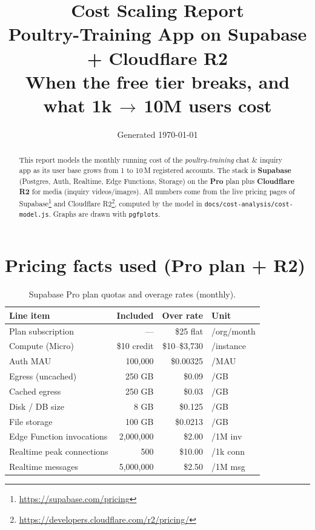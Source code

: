 \documentclass[11pt]{article}
\title{\textbf{Cost Scaling Report}\\ \large Poultry-Training App on Supabase + Cloudflare R2\\ \normalsize When the free tier breaks, and what 1k\,$\to$\,10M users cost}
\author{Generated \today}
\date{}
\begin{document}
\maketitle

\begin{abstract}\small
This report models the monthly running cost of the \emph{poultry-training} chat \& inquiry app as its user base grows from 1 to 10\,M registered accounts. The stack is \textbf{Supabase} (Postgres, Auth, Realtime, Edge Functions, Storage) on the \textbf{Pro} plan plus \textbf{Cloudflare R2} for media (inquiry videos/images). All numbers come from the live pricing pages of Supabase\footnote{\url{https://supabase.com/pricing}} and Cloudflare R2\footnote{\url{https://developers.cloudflare.com/r2/pricing/}}, computed by the model in \texttt{docs/cost-analysis/cost-model.js}. Graphs are drawn with \texttt{pgfplots}.
\end{abstract}

\section{Pricing facts used (Pro plan + R2)}

\begin{table}[H]\centering\small
\caption{Supabase Pro plan quotas and overage rates (monthly).}
\begin{tabular}{l r r l}
\toprule
\textbf{Line item} & \textbf{Included} & \textbf{Over rate} & \textbf{Unit} \\
\midrule
Plan subscription        & ---            & \$25 flat     & /org/month \\
Compute (Micro)         & \$10 credit    & \$10--\$3,730  & /instance \\
Auth MAU                 & 100{,}000      & \$0.00325     & /MAU \\
Egress (uncached)        & 250 GB         & \$0.09        & /GB \\
Cached egress            & 250 GB         & \$0.03        & /GB \\
Disk / DB size           & 8 GB           & \$0.125       & /GB \\
File storage             & 100 GB         & \$0.0213      & /GB \\
Edge Function invocations& 2{,}000{,}000  & \$2.00        & /1M inv \\
Realtime peak connections& 500            & \$10.00       & /1k conn \\
Realtime messages        & 5{,}000{,}000  & \$2.50        & /1M msg \\
\bottomrule
\end{tabular}
\end{table}
\end{document}
